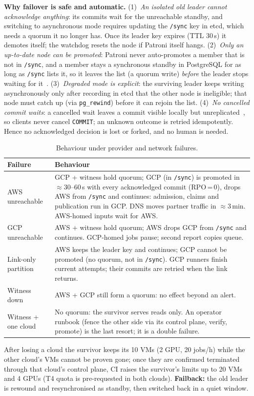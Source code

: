 \documentclass[10pt,a4paper]{article}
\begin{document}
\textbf{Why failover is safe and automatic.} (1)~\emph{An isolated old leader cannot acknowledge anything}: its
commits wait for the unreachable standby, and switching to asynchronous mode requires updating the
\texttt{/sync} key in etcd, which needs a quorum it no longer has. Once its leader key expires (TTL 30\,s) it
demotes itself; the watchdog resets the node if Patroni itself hangs. (2)~\emph{Only an up-to-date node can be
promoted}: Patroni never auto-promotes a member that is not in \texttt{/sync}, and a member stays a
synchronous standby in PostgreSQL for as long as \texttt{/sync} lists it, so it leaves the list (a quorum
write) \emph{before} the leader stops waiting for it~\cite{patroni-sync}. (3)~\emph{Degraded mode is explicit}: the surviving
leader keeps writing asynchronously only after recording in etcd that the other node is ineligible; that
node must catch up (via \texttt{pg\_rewind}) before it can rejoin the list. (4)~\emph{No cancelled commit
waits}: a cancelled wait leaves a commit visible locally but unreplicated~\cite{patroni-sync}, so clients
never cancel \texttt{COMMIT}; an unknown outcome is retried idempotently. Hence no acknowledged decision is
lost or forked, and no human is needed.

\begin{table}[H]\centering\small
\begin{tabularx}{\linewidth}{@{}L{2.7cm}Y@{}}
\toprule
\textbf{Failure} & \textbf{Behaviour} \\ \midrule
AWS unreachable & GCP + witness hold quorum; GCP (in \texttt{/sync}) is promoted in $\approx$30--60\,s with every
  acknowledged commit (RPO\,=\,0), drops AWS from \texttt{/sync} and continues: admission, claims and publication run
  in GCP. DNS moves partner traffic in $\approx$3\,min. AWS-homed inputs wait for AWS. \\
GCP unreachable & AWS + witness hold quorum; AWS drops GCP from \texttt{/sync} and continues. GCP-homed jobs pause; second
  report copies queue. \\
Link-only partition & AWS keeps the leader key and continues; GCP cannot be promoted (no quorum, not in \texttt{/sync}).
  GCP runners finish current attempts; their commits are retried when the link returns. \\
Witness down & AWS + GCP still form a quorum: no effect beyond an alert. \\
Witness + one cloud & No quorum: the survivor serves reads only. An operator runbook (fence the other side via its
  control plane, verify, promote) is the last resort; it is a double failure. \\
\bottomrule
\end{tabularx}
\caption{Behaviour under provider and network failures.}
\end{table}
\vspace{-8pt}
After losing a cloud the survivor keeps its 10 VMs (2 GPU, 20 jobs/h) while the other cloud's VMs cannot be
proven gone; once they are confirmed terminated through that cloud's control plane, CI raises the survivor's
limits up to 20 VMs and 4 GPUs (T4 quota is pre-requested in both clouds).
\textbf{Failback:} the old leader is rewound and resynchronised as standby, then switched back in a quiet window.
\end{document}
